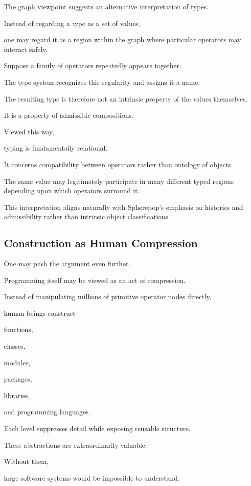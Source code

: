 \documentclass[12pt,oneside]{article}
\begin{document}
The graph viewpoint suggests an alternative interpretation of types.

Instead of regarding a type as a set of values,

one may regard it as a region within the graph where particular operators may interact safely.

Suppose a family of operators repeatedly appears together.

The type system recognizes this regularity and assigns it a name.

The resulting type is therefore not an intrinsic property of the values themselves.

It is a property of admissible compositions.

Viewed this way,

typing is fundamentally relational.

It concerns compatibility between operators rather than ontology of objects.

The same value may legitimately participate in many different typed regions depending upon which operators surround it.

This interpretation aligns naturally with Spherepop's emphasis on histories and admissibility rather than intrinsic object classifications.

\subsection{Construction as Human Compression}

One may push the argument even further.

Programming itself may be viewed as an act of compression.

Instead of manipulating millions of primitive operator nodes directly,

human beings construct

functions,

classes,

modules,

packages,

libraries,

and programming languages.

Each level suppresses detail while exposing reusable structure.

These abstractions are extraordinarily valuable.

Without them,

large software systems would be impossible to understand.
\end{document}
